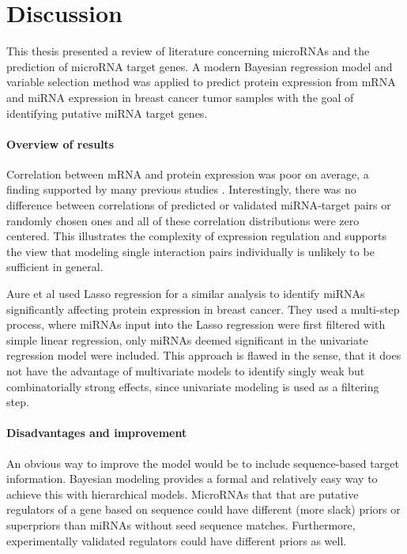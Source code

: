 
\section{Discussion}

This thesis presented a review of literature concerning microRNAs and the
prediction of microRNA target genes. A modern Bayesian regression model and
variable selection method was applied to predict protein expression from mRNA
and miRNA expression in breast cancer tumor samples with the goal of
identifying putative miRNA target genes.

\paragraph{Overview of results}

Correlation between mRNA and protein expression was poor on average, a finding
supported by many previous studies \citep{Payne2015}. Interestingly,
there was no difference between correlations of predicted or validated
miRNA-target pairs or randomly chosen ones and all of these correlation
distributions were zero centered. This illustrates the
complexity of expression regulation and supports the view that modeling
single interaction pairs individually is unlikely to be sufficient in
general.

Aure et al used Lasso regression for a similar analysis
to identify miRNAs significantly
affecting protein expression in breast cancer. They used a multi-step
process, where miRNAs input into the Lasso regression were first
filtered with simple linear regression, only miRNAs deemed significant
in the univariate regression model were included. This approach is
flawed in the sense, that it does not have the advantage of multivariate
models to identify singly weak but combinatorially strong effects, since univariate
modeling is used as a filtering step.

\paragraph{Disadvantages and improvement}

An obvious way to improve the model would be to include sequence-based target
information. Bayesian modeling provides a formal and relatively easy way to
achieve this with hierarchical models. MicroRNAs that that are putative
regulators of a gene based on sequence could have different (more slack)
priors or superpriors than miRNAs without seed sequence matches. Furthermore,
experimentally validated regulators could have different priors as well.

